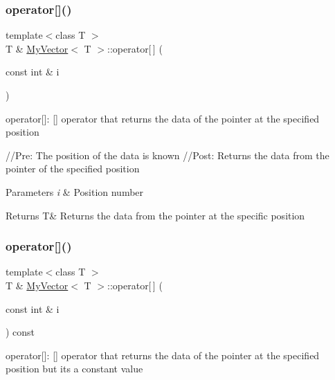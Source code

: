 \subsubsection{\texorpdfstring{operator[]()}{operator[]()}\hspace{0.1cm}{\footnotesize\ttfamily [1/2]}}
{\footnotesize\ttfamily template$<$class T $>$ \\
T \& \mbox{\hyperlink{class_my_vector}{My\+Vector}}$<$ T $>$\+::operator\mbox{[}$\,$\mbox{]} (\begin{DoxyParamCaption}\item[{const int \&}]{i }\end{DoxyParamCaption})}



operator\mbox{[}\mbox{]}\+: \mbox{[}\mbox{]} operator that returns the data of the pointer at the specified position 

//\+Pre\+: The position of the data is known //\+Post\+: Returns the data from the pointer of the specified position 
\begin{DoxyParams}{Parameters}
{\em i} & Position number \\
\hline
\end{DoxyParams}
\begin{DoxyReturn}{Returns}
T\& Returns the data from the pointer at the specific position 
\end{DoxyReturn}
\mbox{\label{class_my_vector_a01d48c27ba17ad15aa29b2f039c303cd}} 
\subsubsection{\texorpdfstring{operator[]()}{operator[]()}\hspace{0.1cm}{\footnotesize\ttfamily [2/2]}}
{\footnotesize\ttfamily template$<$class T $>$ \\
T \& \mbox{\hyperlink{class_my_vector}{My\+Vector}}$<$ T $>$\+::operator\mbox{[}$\,$\mbox{]} (\begin{DoxyParamCaption}\item[{const int \&}]{i }\end{DoxyParamCaption}) const}



operator\mbox{[}\mbox{]}\+: \mbox{[}\mbox{]} operator that returns the data of the pointer at the specified position but it\textquotesingle{}s a constant value 

